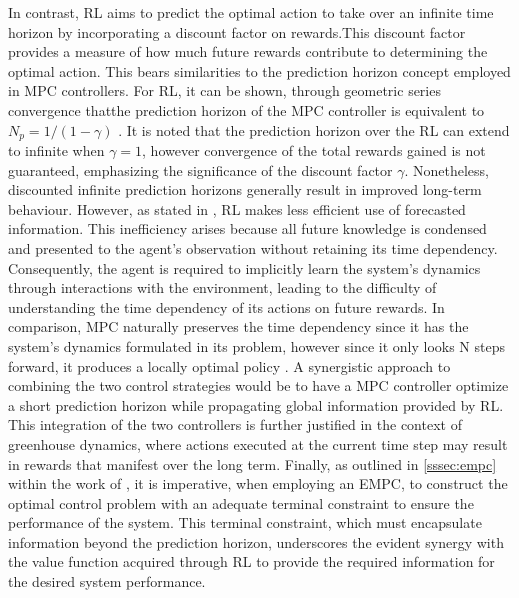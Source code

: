 In contrast, RL aims to predict the optimal action to take over an infinite time horizon by incorporating a discount factor on rewards.This discount factor provides a measure of how much future rewards contribute to determining the optimal action. This bears similarities to the prediction horizon concept employed in MPC controllers. For RL, it can be shown, through geometric series convergence thatthe prediction horizon of the MPC controller is equivalent to $N_p = 1/(1 - \gamma)$ \cite{arroyoReinforcedModelPredictive2022}.
It is noted that the prediction horizon over the RL can extend to infinite when $\gamma = 1$, however convergence of the total rewards gained is not guaranteed,  emphasizing the significance of the discount factor $\gamma$. Nonetheless, discounted infinite prediction horizons generally result in improved long-term behaviour. However, as stated in \cite{arroyoReinforcedModelPredictive2022}, RL makes less efficient use of forecasted information. This inefficiency arises because all future knowledge is condensed and presented to the agent's observation without retaining its time dependency. Consequently, the agent is required to implicitly learn the system's dynamics through interactions with the environment, leading to the difficulty of understanding the time dependency of its actions on future rewards. In comparison, MPC naturally preserves the time dependency since it has the system’s dynamics formulated in its problem, however since it only looks N steps forward, it produces a locally optimal policy \cite{linReinforcementLearningBasedModel2023}. A synergistic approach to combining the two control strategies would be to have a MPC controller optimize a short prediction horizon while propagating global information provided by RL. This integration of the two controllers is further justified in the context of greenhouse dynamics, where actions executed at the current time step may result in rewards that manifest over the long term. Finally, as outlined in \autoref{sssec:empc} within the work of \cite{ellisTutorialReviewEconomic2014}, it is imperative, when employing an EMPC, to construct the optimal control problem with an adequate terminal constraint to ensure the performance of the system.  This terminal constraint, which must encapsulate information beyond the prediction horizon, underscores the evident synergy with the value function acquired through RL to provide the required information for the desired system performance.


